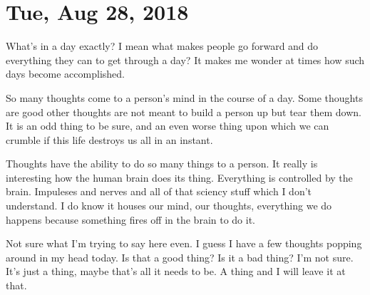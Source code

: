\section{Tue, Aug 28, 2018}

What's in a day exactly? I mean what makes people go forward and do everything they
can to get through a day? It makes me wonder at times how such days become
accomplished.

So many thoughts come to a person's mind in the course of a day. Some thoughts are
good other thoughts are not meant to build a person up but tear them down. It is an
odd thing to be sure, and an even worse thing upon which we can crumble if this life
destroys us all in an instant.

Thoughts have the ability to do so many things to a person. It really is interesting
how the human brain does its thing. Everything is controlled by the brain. Impuleses
and nerves and all of that sciency stuff which I don't understand. I do know it
houses our mind, our thoughts, everything we do happens because something fires off
in the brain to do it.

Not sure what I'm trying to say here even. I guess I have a few thoughts popping
around in my head today. Is that a good thing? Is it a bad thing? I'm not sure. It's
just a thing, maybe that's all it needs to be. A thing and I will leave it at that.
